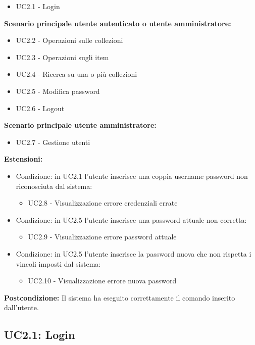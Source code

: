 \documentclass{scalatekids-article}
\begin{document}
\begin{itemize}
  \item UC2.1 - Login
\end{itemize}
\textbf{Scenario principale utente autenticato o utente amministratore:} 
\begin{itemize}
  \item UC2.2 - Operazioni sulle collezioni
  \item UC2.3 - Operazioni sugli item
  \item UC2.4 - Ricerca su una o più collezioni
  \item UC2.5 - Modifica password
  \item UC2.6 - Logout
\end{itemize}
\textbf{Scenario principale utente amministratore:} 
\begin{itemize}
  \item UC2.7 - Gestione utenti
\end{itemize}
\textbf{Estensioni:}
\begin{itemize}
  \item Condizione: in UC2.1 l'utente inserisce una coppia username password non riconosciuta dal sistema:
  \begin{itemize}
    \item UC2.8 - Visualizzazione errore credenziali errate
  \end{itemize}
  \item Condizione: in UC2.5 l'utente inserisce una password attuale non corretta:
  \begin{itemize}
    \item UC2.9 - Visualizzazione errore password attuale
  \end{itemize}
  \item Condizione: in UC2.5 l'utente inserisce la password nuova che non rispetta i vincoli imposti dal sistema: %
  \begin{itemize}
    \item UC2.10 - Visualizzazione errore nuova password
  \end{itemize}
\end{itemize}
\textbf{Postcondizione:} Il sistema ha eseguito correttamente il comando inserito dall'utente.

\subsection{UC2.1: Login}
\end{document}

